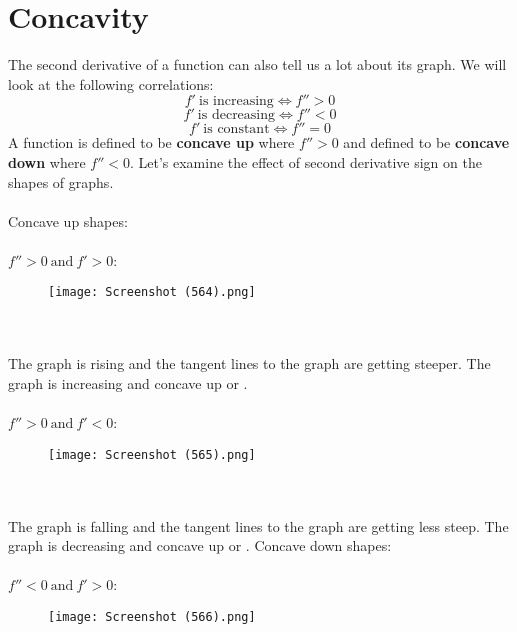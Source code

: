 \documentclass[11pt]{scrartcl}
\begin{document}
\section{Concavity}
\noindent 
The second derivative of a function can also tell us a lot about its graph. We will look at the following correlations: 
$$f' \ \text{is increasing} \Leftrightarrow f''>0$$
$$f' \ \text{is decreasing} \Leftrightarrow f''<0$$
$$f' \ \text{is constant} \Leftrightarrow f''=0$$
\noindent 
A function is defined to be \textbf{concave up} where $f''>0$ and defined to be \textbf{concave down} where $f''<0$. Let's examine the effect of second derivative sign on the shapes of graphs. \\
\\
\noindent 
Concave up shapes: \\
\\
\noindent 
$f''>0 \ \text{and} \ f'>0$: 
\begin{figure}[htp]
    \centering
    \texttt{[image: Screenshot (564).png]}
\end{figure}\\
\\
\noindent 
The graph is rising and the tangent lines to the graph are getting steeper. The graph is increasing and concave up or . \\
\\
\noindent 
$f''>0 \ \text{and} \ f'<0$: 
\begin{figure}[htp]
    \centering
    \texttt{[image: Screenshot (565).png]}
\end{figure} \\
\\
\noindent 
The graph is falling and the tangent lines to the graph are getting less steep. The graph is decreasing and concave up or .
\noindent 
Concave down shapes: \\
\\
\noindent 
$f''<0 \ \text{and} \ f'>0$: 
\begin{figure}[htp]
    \centering
    \texttt{[image: Screenshot (566).png]}
\end{figure}
\end{document}
